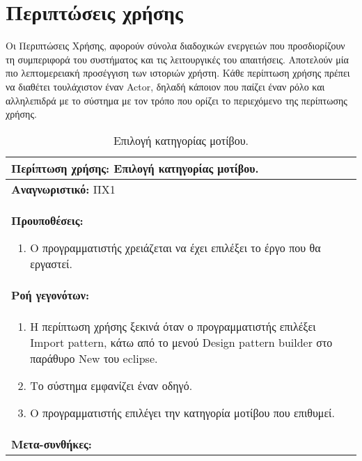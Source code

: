 \section{Περιπτώσεις χρήσης}
Οι Περιπτώσεις Χρήσης, αφορούν σύνολα διαδοχικών ενεργειών που προσδιορίζουν τη συμπεριφορά του συστήματος και τις λειτουργικές του απαιτήσεις. Αποτελούν μία πιο λεπτομερειακή προσέγγιση των ιστοριών χρήστη. Κάθε περίπτωση χρήσης πρέπει να διαθέτει τουλάχιστον έναν Actor, δηλαδή κάποιον που παίζει έναν ρόλο και αλληλεπιδρά με το σύστημα με τον τρόπο που ορίζει το περιεχόμενο της περίπτωσης χρήσης.
\begin{table}[H]
	\hspace*{-0.2cm}
    \centering
    \scriptsize
	\begin{tabular}{|p{10cm}|}
		\hline
		\textbf{Περίπτωση χρήσης:} Επιλογή κατηγορίας μοτίβου.\\
		\hline
		\textbf{Αναγνωριστικό:} ΠΧ1\\
		\hline	
		\textbf{Προυποθέσεις:}
		\begin{enumerate}
			\item Ο προγραμματιστής χρειάζεται να έχει επιλέξει το έργο που θα εργαστεί.
		\end{enumerate}\\
		\hline
		\textbf{Ροή γεγονότων:} \\ 
		\begin{enumerate}
			\item Η περίπτωση χρήσης ξεκινά όταν ο προγραμματιστής επιλέξει Import pattern, κάτω από το μενού Design pattern builder στο παράθυρο New του eclipse. 
			\item Το σύστημα εμφανίζει έναν οδηγό.
			\item Ο προγραμματιστής επιλέγει την κατηγορία μοτίβου που επιθυμεί.
		\end{enumerate}\\
		\hline
		\textbf{Μετα-συνθήκες:} \\
		\hline
    \end{tabular}
    \caption{Επιλογή κατηγορίας μοτίβου.}
    \label{tab:selectPatternCategoryUC}
\end{table}
